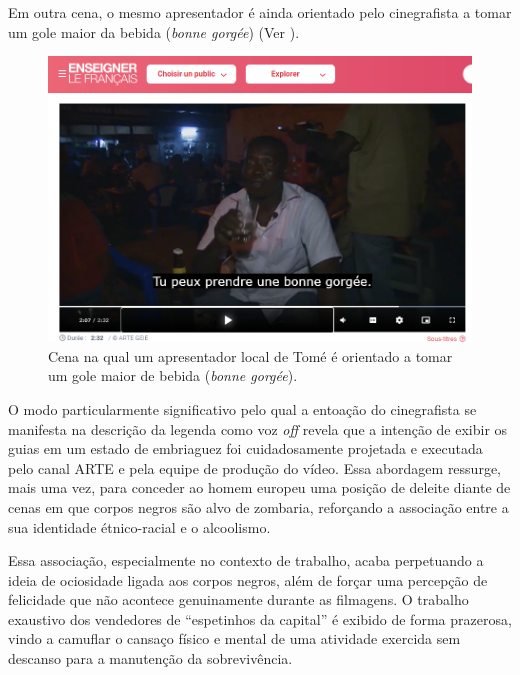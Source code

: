 \documentclass[portuguese]{textolivre}
\begin{document}
Em outra cena, o mesmo apresentador é ainda orientado pelo cinegrafista a tomar um gole maior da bebida (\textit{bonne gorgée}) (Ver ).

\begin{figure}
    \centering
    \begin{minipage}{.75\textwidth}
    \includegraphics[width=\linewidth]{Fig10.png}
    \caption{Cena na qual um apresentador local de Tomé é orientado a tomar um gole maior de bebida (\textit{bonne gorgée}).}
    \label{fig10}
    \end{minipage}
\end{figure}

O modo particularmente significativo pelo qual a entoação do cinegrafista se manifesta na descrição da legenda como voz \textit{off} revela que a intenção de exibir os guias em um estado de embriaguez foi cuidadosamente projetada e executada pelo canal ARTE e pela equipe de produção do vídeo. Essa abordagem ressurge, mais uma vez, para conceder ao homem europeu uma posição de deleite diante de cenas em que corpos negros são alvo de zombaria, reforçando a associação entre a sua identidade étnico-racial e o alcoolismo.

Essa associação, especialmente no contexto de trabalho, acaba perpetuando a ideia de ociosidade ligada aos corpos negros, além de forçar uma percepção de felicidade que não acontece genuinamente durante as filmagens. O trabalho exaustivo dos vendedores de “espetinhos da capital” é exibido de forma prazerosa, vindo a camuflar o cansaço físico e mental de uma atividade exercida sem descanso para a manutenção da sobrevivência. 
\end{document}
